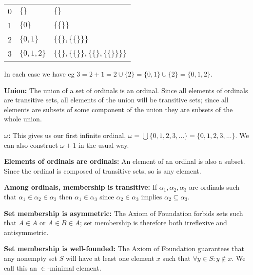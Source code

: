 \documentclass{article}
\begin{document}
\begin{tabular}{ l l l }
0 & $\{\}$ & $\{\}$ \\
1 & $\{0\}$ & $\{\{\}\}$ \\
2 & $\{0, 1\}$ & $\{\{\}, \{\{\}\}\}$ \\
3 & $\{0, 1, 2\}$ & $\{\{\}, \{\{\}\}, \{\{\}, \{\{\}\}\}\}$ \\
\end{tabular}

In each case we have eg $3 = 2 + 1 = 2 \cup \{2\} = \{0, 1\} \cup \{2\} = \{0, 1, 2\}$.

\textbf{Union:} The union of a set of ordinals is an ordinal. Since all elements of ordinals are transitive sets, all elements of the union will be transitive sets; since all elements are subsets of some component of the union they are subsets of the whole union.

\textbf{$\omega$:} This gives us our first infinite ordinal, $\omega = \bigcup\{0, 1, 2, 3, \ldots\} =  \{0, 1, 2, 3, \ldots\}$. We can also construct $\omega + 1$ in the usual way.

\textbf{Elements of ordinals are ordinals:} An element of an ordinal is also a subset. Since the ordinal is composed of transitive sets, so is any element.

\textbf{Among ordinals, membership is transitive:} If $\alpha_1, \alpha_2, \alpha_3$ are ordinals such that $\alpha_1 \in \alpha_2 \in \alpha_3$ then $\alpha_1 \in \alpha_3$ since $\alpha_2 \in \alpha_3$ implies $\alpha_2 \subseteq \alpha_3$.

\textbf{Set membership is asymmetric:} The Axiom of Foundation forbids sets such that $A \in A$ or $A \in B \in A$; set membership is therefore both irreflexive and antisymmetric.

\textbf{Set membership is well-founded:} The Axiom of Foundation guarantees that any nonempty set $S$ will have at least one element $x$ such that $\forall y \in S: y \not\in x$. We call this an $\in$-minimal element.
\end{document}
